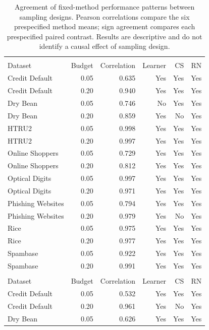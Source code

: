\begin{table}[t]
\centering
\caption{Agreement of fixed-method performance patterns between sampling designs. Pearson correlations compare the six prespecified method means; sign agreement compares each prespecified paired contrast. Results are descriptive and do not identify a causal effect of sampling design.}
\label{tab:s-real-design-agreement}
\small
\setlength{\tabcolsep}{3.5pt}
\renewcommand{\arraystretch}{1.08}
\begin{tabularx}{\textwidth}{>{\raggedright\arraybackslash}Xrrrrr}
\toprule
\multicolumn{6}{l}{\textbf{AUROC}}\\
Dataset & Budget & Correlation & Learner & CS & RN \\
\midrule
Credit Default & 0.05 & 0.635 & Yes & Yes & Yes \\
Credit Default & 0.20 & 0.940 & Yes & Yes & Yes \\
Dry Bean & 0.05 & 0.746 & No & Yes & Yes \\
Dry Bean & 0.20 & 0.859 & Yes & No & Yes \\
HTRU2 & 0.05 & 0.998 & Yes & Yes & Yes \\
HTRU2 & 0.20 & 0.997 & Yes & Yes & Yes \\
Online Shoppers & 0.05 & 0.729 & Yes & Yes & Yes \\
Online Shoppers & 0.20 & 0.812 & Yes & Yes & Yes \\
Optical Digits & 0.05 & 0.997 & Yes & Yes & Yes \\
Optical Digits & 0.20 & 0.971 & Yes & Yes & Yes \\
Phishing Websites & 0.05 & 0.794 & Yes & Yes & Yes \\
Phishing Websites & 0.20 & 0.979 & Yes & No & Yes \\
Rice & 0.05 & 0.975 & Yes & Yes & Yes \\
Rice & 0.20 & 0.977 & Yes & Yes & Yes \\
Spambase & 0.05 & 0.922 & Yes & Yes & Yes \\
Spambase & 0.20 & 0.991 & Yes & Yes & Yes \\
\midrule
\multicolumn{6}{l}{\textbf{AP}}\\
Dataset & Budget & Correlation & Learner & CS & RN \\
\midrule
Credit Default & 0.05 & 0.532 & Yes & Yes & Yes \\
Credit Default & 0.20 & 0.961 & Yes & No & Yes \\
Dry Bean & 0.05 & 0.626 & Yes & Yes & Yes \\

\end{tabularx}
\end{table}
